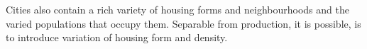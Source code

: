 


Cities also contain a rich variety of housing forms and neighbourhoods and the varied populations that occupy them. Separable from production, it is possible, is to introduce variation of housing form and density.  %


